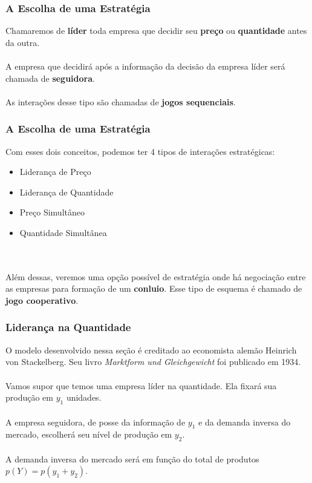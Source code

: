 \documentclass{beamer}[10]
\begin{document}
\begin{frame}
	\frametitle{A Escolha de uma Estratégia}

	Chamaremos de \textbf{líder} toda empresa que decidir seu \textbf{preço} ou \textbf{quantidade} antes da outra. 
	\\~\\
	A empresa que decidirá após a informação da decisão da empresa líder será chamada de \textbf{seguidora}. 
	\\~\\
	As interações desse tipo são chamadas de \textbf{jogos sequenciais}.

\end{frame}


\begin{frame}
	\frametitle{A Escolha de uma Estratégia}

	Com esses dois conceitos, podemos ter 4 tipos de interações estratégicas:

	\begin{itemize}
		\item Liderança de Preço
		\item Liderança de Quantidade
		\item Preço Simultâneo
		\item Quantidade Simultânea
	\end{itemize}
	\ 
	\\~\\
	Além dessas, veremos uma opção possível de estratégia onde há negociação entre as empresas para formação de um \textbf{conluio}. Esse tipo de esquema é chamado de \textbf{jogo cooperativo}.

\end{frame}

\begin{frame}
	\frametitle{Liderança na Quantidade}

	O modelo desenvolvido nessa seção é creditado ao economista alemão Heinrich von Stackelberg. Seu livro \textit{Marktform und Gleichgewicht} foi publicado em 1934.
	\\~\\
	Vamos supor que temos uma empresa líder na quantidade. Ela fixará sua produção em $y_1$ unidades.
	\\~\\
	A empresa seguidora, de posse da informação de $y_1$ e da demanda inversa do mercado, escolherá seu nível de produção em $y_2$.
	\\~\\
	A demanda inversa do mercado será em função do total de produtos $p(Y) = p(y_1 + y_2)$.

\end{frame}
\end{document}
